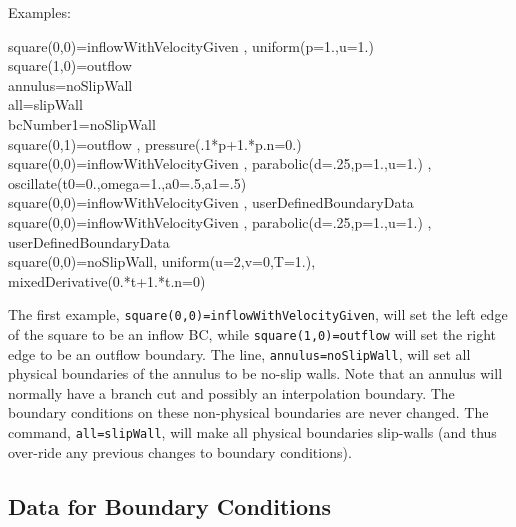 Examples: 
\begin{flushleft}
square(0,0)=inflowWithVelocityGiven , uniform(p=1.,u=1.) \\
square(1,0)=outflow \\
annulus=noSlipWall \\
all=slipWall          \\             
bcNumber1=noSlipWall \\
square(0,1)=outflow , pressure(.1*p+1.*p.n=0.) \\
square(0,0)=inflowWithVelocityGiven , parabolic(d=.25,p=1.,u=1.) , oscillate(t0=0.,omega=1.,a0=.5,a1=.5) \\
square(0,0)=inflowWithVelocityGiven , userDefinedBoundaryData \\
square(0,0)=inflowWithVelocityGiven , parabolic(d=.25,p=1.,u=1.) , userDefinedBoundaryData \\
square(0,0)=noSlipWall,  uniform(u=2,v=0,T=1.), mixedDerivative(0.*t+1.*t.n=0)
\end{flushleft}

The first example, {\tt square(0,0)=inflowWithVelocityGiven}, will set the left edge of the square 
to be an inflow BC, while {\tt square(1,0)=outflow} will set the right edge to be an outflow boundary.
The line, {\tt annulus=noSlipWall}, will set all physical boundaries of the annulus to be no-slip walls.
Note that an annulus will normally have a branch cut and possibly an interpolation boundary. The
boundary conditions on these non-physical boundaries are never changed. The command, {\tt all=slipWall},
will make all physical boundaries slip-walls (and thus over-ride any previous changes to boundary conditions).
  

\subsection{Data for Boundary Conditions}\label{sec:bcDataMenu}

